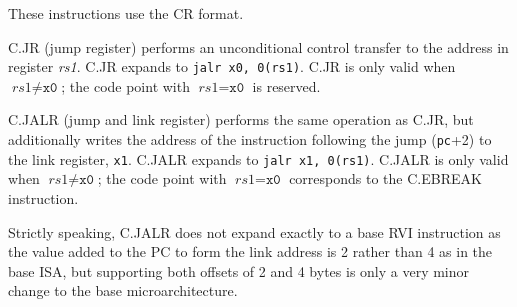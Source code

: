 These instructions use the CR format.

C.JR (jump register) performs an unconditional control transfer to
the address in register {\em rs1}.  C.JR expands to {\tt jalr x0, 0(rs1)}.
C.JR is only valid when $\textit{rs1}{\neq}\texttt{x0}$; the code point
with $\textit{rs1}{=}\texttt{x0}$ is reserved.

C.JALR (jump and link register) performs the same operation as C.JR,
but additionally writes the address of the instruction following the
jump ({\tt pc}+2) to the link register, {\tt x1}.  C.JALR expands to
{\tt jalr x1, 0(rs1)}.
C.JALR is only valid when $\textit{rs1}{\neq}\texttt{x0}$; the code point
with $\textit{rs1}{=}\texttt{x0}$ corresponds to the C.EBREAK instruction.

\begin{commentary}
Strictly speaking, C.JALR does not expand exactly to a base RVI
instruction as the value added to the PC to form the link address is 2
rather than 4 as in the base ISA, but supporting both offsets of 2 and
4 bytes is only a very minor change to the base microarchitecture.
\end{commentary}

